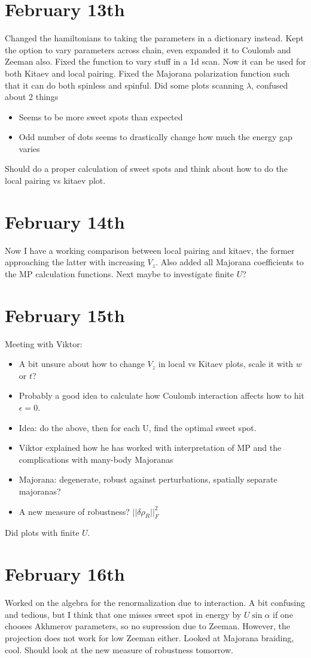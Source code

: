 \documentclass{article}
\begin{document}
\section*{February 13th}
Changed the hamiltonians to taking the parameters in a dictionary instead. Kept the option to vary parameters across chain, even expanded it to Coulomb and Zeeman also. Fixed the function to vary stuff in a 1d scan. Now it can be used for both Kitaev and local pairing. Fixed the Majorana polarization function such that it can do both spinless and spinful. Did some plots scanning $\lambda$, confused about 2 things
\begin{itemize}
    \item Seems to be more sweet spots than expected
    \item Odd number of dots seems to drastically change how much the energy gap varies
\end{itemize}
Should do a proper calculation of sweet spots and think about how to do the local pairing vs kitaev plot.
\section*{February 14th}
Now I have a working comparison between local pairing and kitaev, the former approaching the latter with increasing $V_z$. Also added all Majorana coefficients to the MP calculation functions. Next maybe to investigate finite $U$?
\section*{February 15th}
Meeting with Viktor:
\begin{itemize}
    \item A bit unsure about how to change $V_z$ in local vs Kitaev plots, scale it with $w$ or $t$?
    \item Probably a good idea to calculate how Coulomb interaction affects how to hit $\epsilon = 0$.
    \item Idea: do the above, then for each U, find the optimal sweet spot.
    \item Viktor explained how he has worked with interpretation of MP and the complications with many-body Majoranas
    \item Majorana: degenerate, robust against perturbations, spatially separate majoranas?
    \item A new measure of robustness? $||\delta\rho_R||_F^2$
\end{itemize}
Did plots with finite $U$.
\section*{February 16th}
Worked on the algebra for the renormalization due to interaction. A bit confusing and tedious, but I think that one misses sweet spot in energy by $U \sin{\alpha}$ if one chooses Akhmerov parameters, so no supression due to Zeeman. However, the projection does not work for low Zeeman either. Looked at Majorana braiding, cool. Should look at the new measure of robustness tomorrow.
\end{document}
